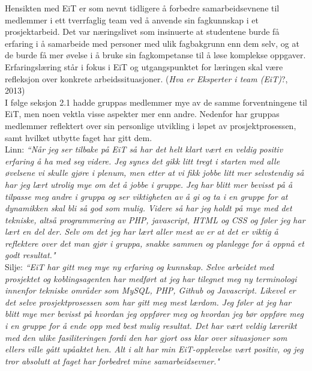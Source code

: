 Hensikten med EiT er som nevnt tidligere å forbedre samarbeidsevnene til medlemmer i ett tverrfaglig team ved å anvende sin fagkunnskap i et prosjektarbeid. Det var næringslivet som insinuerte at studentene burde få erfaring i å samarbeide med personer med ulik fagbakgrunn enn dem selv, og at de burde få mer øvelse i å bruke sin fagkompetanse til å løse komplekse oppgaver. Erfaringslæring står i fokus i EiT og utgangspunktet for læringen skal være refleksjon over konkrete arbeidssituasjoner. (\textit{Hva er Eksperter i team (EiT)}?, 2013)\\

I følge seksjon 2.1 hadde gruppas medlemmer mye av de samme forventningene til EiT, men noen vektla visse aspekter mer enn andre. Nedenfor har gruppas medlemmer reflektert over sin personlige utvikling i løpet av prosjektprosessen, samt hvilket utbytte faget har gitt dem.\\

Linn: \textit{``Når jeg ser tilbake på EiT så har det helt klart vært en veldig positiv erfaring å ha med seg videre. Jeg synes det gikk litt tregt i starten med alle øvelsene vi skulle gjøre i plenum, men etter at vi fikk jobbe litt mer selvstendig så har jeg lært utrolig mye om det å jobbe i gruppe. Jeg har blitt mer bevisst på å tilpasse meg andre i gruppa og ser viktigheten av å gi og ta i en gruppe for at dynamikken skal bli så god som mulig. Videre så har jeg holdt på mye med det tekniske, altså programmering av PHP, javascript, HTML og CSS og føler jeg har lært en del der. Selv om det jeg har lært aller mest av er at det er viktig å reflektere over det man gjør i gruppa, snakke sammen og planlegge for å oppnå et godt resultat."}\\

Silje: \textit{``EiT har gitt meg mye ny erfaring og kunnskap. Selve arbeidet med prosjektet og koblingsagenten har medført at jeg har tilegnet meg ny terminologi innenfor tekniske områder som MySQL, PHP, Github og Javascript. Likevel er det selve prosjektprosessen som har gitt meg mest lærdom. Jeg føler at jeg har blitt mye mer bevisst på hvordan jeg oppfører meg og hvordan jeg bør oppføre meg i en gruppe for å ende opp med best mulig resultat. Det har vært veldig lærerikt med den ulike fasiliteringen fordi den har gjort oss klar over situasjoner som ellers ville gått upåaktet hen. Alt i alt har min EiT-opplevelse vært positiv, og jeg tror absolutt at faget har forbedret mine samarbeidsevner."}\\

